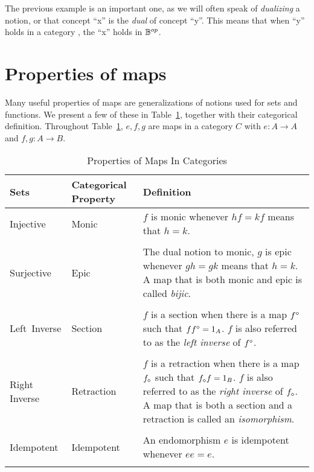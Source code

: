 The previous example is an important one, as we will often speak of \emph{dualizing} a notion, or
that concept ``x'' is the \emph{dual} of concept ``y''. This means that when ``y'' holds in a
category \B, the ``x'' holds in ${\mathbb{B}}^{op}$.

\section{Properties of maps} %
\label{sub:properties_of_maps}
Many useful properties of maps are generalizations of notions used for sets and functions. We
present a few of these in Table~\ref{tab:properties_of_maps_in_categories}, together with their
categorical definition. Throughout Table~\ref{tab:properties_of_maps_in_categories}, $e,f,g$ are
maps in a category $C$ with $e:A \to A$ and $f,g:A \to B$.
\begin{table}[!htbp]
  \begin{center}
    \begin{tabular}{|p{1in}p{1in}p{3.78in}|}
      \hline
      {\bf Sets} & {\bf Categorical Property} & {\bf Definition}\\
      \hline
      \hline
      Injective & Monic & $f$ is monic whenever $h f = k f$ means that $h = k$.\\
      & & \\
      \hline
      Surjective & Epic & {The dual notion to monic, $g$ is epic whenever $g h = g k$ means that $h = k$.
      A map that is both monic and epic is called \emph{bijic}.}\\
      & & \\
      \hline
      Left~Inverse & Section & $f$ is a section when there is a map ${f}^\diamond$ such that $f {f}^\diamond = 1_A$. $f$
      is also referred to as the \emph{left inverse} of ${f}^\diamond$.\\
      & & \\
      \hline
      Right Inverse & Retraction & $f$ is a retraction when there is a map ${f}_\diamond$ such that ${f}_\diamond f = 1_B$.
      $f$ is also referred to as the \emph{right inverse} of ${f}_\diamond$. A map that is both a section and a
      retraction is called an \emph{isomorphism}.\\
      & & \\
      \hline
      Idempotent & Idempotent & An endomorphism $e$ is idempotent whenever $e e = e$.\\
      & & \\
      \hline
    \end{tabular}
  \end{center}
  \caption{Properties of Maps In Categories}
  \label{tab:properties_of_maps_in_categories}
\end{table}

